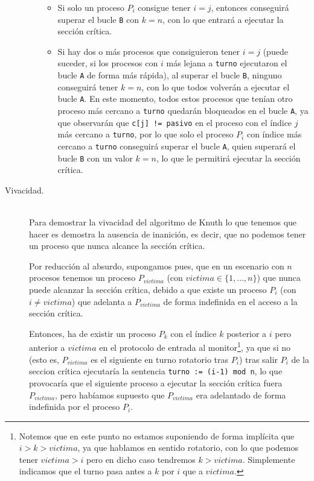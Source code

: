 \begin{description}
\begin{itemize}
\begin{itemize}
                    \item Si solo un proceso $P_i$ consigue tener $i = j$, entonces conseguirá superar el bucle \verb|B| con $k = n$, con lo que entrará a ejecutar la sección crítica.
                    \item Si hay dos o más procesos que consiguieron tener $i = j$ (puede suceder, si los procesos con $i$ más lejana a \verb|turno| ejecutaron el bucle \verb|A| de forma más rápida), al superar el bucle \verb|B|, ninguno conseguirá tener $k = n$, con lo que todos volverán a ejecutar el bucle \verb|A|. En este momento, todos estos procesos que tenían otro proceso más cercano a \verb|turno| quedarán bloqueados en el bucle \verb|A|, ya que observarán que \verb|c[j] != pasivo| en el proceso con el índice $j$ más cercano a \verb|turno|, por lo que solo el proceso $P_i$ con índice más cercano a \verb|turno| conseguirá superar el bucle \verb|A|, quien superará el bucle \verb|B| con un valor $k = n$, lo que le permitirá ejecutar la sección crítica.
                \end{itemize}
        \end{itemize}
    \item [Vivacidad.]~\\
        Para demostrar la vivacidad del algoritmo de Knuth lo que tenemos que hacer es demostra la ausencia de inanición, es decir, que no podemos tener un proceso que nunca alcance la sección crítica.

        Por reducción al absurdo, supongamos pues, que en un escenario con $n$ procesos tenemos un proceso $P_{victima}$ (con $victima \in \{1,\ldots,n\}$) que nunca puede alcanzar la sección crítica, debido a que existe un proceso $P_i$ (con $i\neq victima$) que adelanta a $P_{victima}$ de forma indefinida en el acceso a la sección crítica.

        Entonces, ha de existir un proceso $P_k$ con el índice $k$ posterior a $i$ pero anterior a $victima$ en el protocolo de entrada al monitor\footnote{Notemos que en este punto no estamos suponiendo de forma implícita que $i>k>victima$, ya que hablamos en sentido rotatorio, con lo que podemos tener $victima > i$ pero en dicho caso tendremos $k>victima$. Simplemente indicamos que el turno pasa antes a $k$ por $i$ que a $victima$.}, ya que si no (esto es, $P_{victima}$ es el siguiente en turno rotatorio tras $P_i$) tras salir $P_i$ de la seccion crítica ejecutaría la sentencia \verb|turno := (i-1) mod n|, lo que provocaría que el siguiente proceso a ejecutar la sección crítica fuera $P_{victima}$, pero habíamos supuesto que $P_{victima}$ era adelantado de forma indefinida por el proceso $P_i$.


\end{description}
